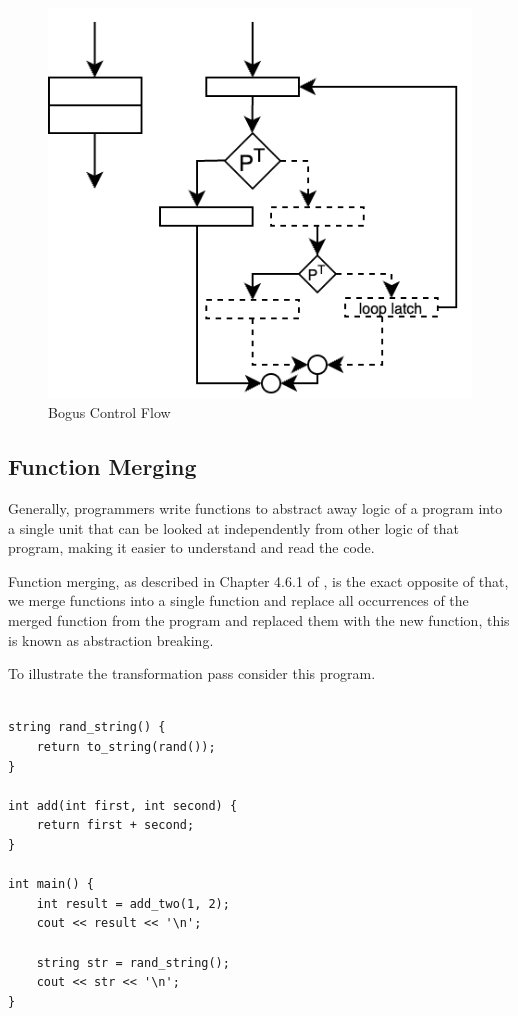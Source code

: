 \begin{figure}
  \includegraphics[width=1\textwidth]{./images/bogus-flow.png}
  \caption{Bogus Control Flow}
\end{figure}

\subsection{Function Merging}

Generally, programmers write functions to abstract away logic of a program
into a single unit that can be looked at independently from other logic of that program, making it easier to understand and read the code.

Function merging, as described in Chapter 4.6.1 of \cite{ss-chpt4}, is the exact opposite of that, we merge functions into a single function and replace all occurrences of the merged function
from the program and replaced them with the new function, this is known as abstraction breaking.

To illustrate the transformation pass consider this program.

\lstset{language=C++} %
\lstset{basicstyle=\ttfamily} %
\begin{lstlisting}

string rand_string() {
    return to_string(rand());
}

int add(int first, int second) {
    return first + second;
}

int main() {
    int result = add_two(1, 2);
    cout << result << '\n';

    string str = rand_string();
    cout << str << '\n';
}

\end{lstlisting}

